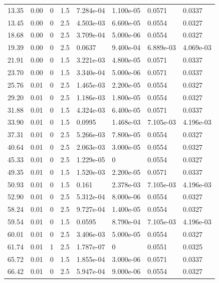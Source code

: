 \documentclass[preview]{standalone}
\begin{document}
{{\begin{tabular}{L{1.2cm}C{1.2cm} C{0.3cm}C{0.5cm} C{1.4cm}C{1.4cm} C{1.4cm}C{1.4cm}}
  13.35  &  0.00  & 0     & 1.5 &  7.284e-04  & 1.100e-05  & 0.0571 &  0.0337   \\ 
  13.45  &  0.00  & 0     & 2.5 &  4.503e-03  & 6.600e-05  & 0.0554 &  0.0327   \\ 
  18.68  &  0.00  & 0     & 2.5 &  3.709e-04  & 5.000e-06  & 0.0554 &  0.0327   \\ 
  19.39  &  0.00  & 0     & 2.5 &  0.0637  & 9.400e-04  & 6.889e-03 &  4.069e-03   \\ 
  21.91  &  0.00  & 0     & 1.5 &  3.221e-03  & 4.800e-05  & 0.0571 &  0.0337   \\ 
  23.70  &  0.00  & 0     & 1.5 &  3.340e-04  & 5.000e-06  & 0.0571 &  0.0337   \\ 
  25.76  &  0.01  & 0     & 2.5 &  1.465e-03  & 2.200e-05  & 0.0554 &  0.0327   \\ 
  29.20  &  0.01  & 0     & 2.5 &  1.186e-03  & 1.800e-05  & 0.0554 &  0.0327   \\ 
  31.88  &  0.01  & 0     & 1.5 &  4.324e-03  & 6.400e-05  & 0.0571 &  0.0337   \\ 
  33.90  &  0.01  & 0     & 1.5 &  0.0995  & 1.468e-03  & 7.105e-03 &  4.196e-03   \\ 
  37.31  &  0.01  & 0     & 2.5 &  5.266e-03  & 7.800e-05  & 0.0554 &  0.0327   \\ 
  40.64  &  0.01  & 0     & 2.5 &  2.063e-03  & 3.000e-05  & 0.0554 &  0.0327   \\ 
  45.33  &  0.01  & 0     & 2.5 &  1.229e-05  & 0  & 0.0554 &  0.0327   \\ 
  49.35  &  0.01  & 0     & 1.5 &  1.520e-03  & 2.200e-05  & 0.0571 &  0.0337   \\ 
  50.93  &  0.01  & 0     & 1.5 &  0.161  & 2.378e-03  & 7.105e-03 &  4.196e-03   \\ 
  52.90  &  0.01  & 0     & 2.5 &  5.312e-04  & 8.000e-06  & 0.0554 &  0.0327   \\ 
  58.24  &  0.01  & 0     & 2.5 &  9.727e-04  & 1.400e-05  & 0.0554 &  0.0327   \\ 
  59.54  &  0.01  & 0     & 1.5 &  0.0595  & 8.790e-04  & 7.105e-03 &  4.196e-03   \\ 
  60.01  &  0.01  & 0     & 2.5 &  3.406e-03  & 5.000e-05  & 0.0554 &  0.0327   \\ 
  61.74  &  0.01  & 1     & 2.5 &  1.787e-07  & 0  & 0.0551 &  0.0325   \\ 
  65.72  &  0.01  & 0     & 1.5 &  1.855e-04  & 3.000e-06  & 0.0571 &  0.0337   \\ 
  66.42  &  0.01  & 0     & 2.5 &  5.947e-04  & 9.000e-06  & 0.0554 &  0.0327   \\ 

\end{tabular}}}
\end{document}

